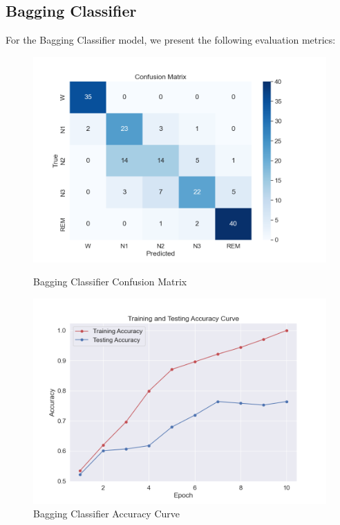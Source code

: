 \subsection{Bagging Classifier}

For the Bagging Classifier model, we present the following evaluation metrics:

\begin{figure}[H]
	\centering
	\begin{minipage}[t]{0.48\textwidth}
		\centering
		\includegraphics[width=\textwidth]{img/paper_1/BG_confusion_matrix.png}
		\caption{Bagging Classifier Confusion Matrix}
	\end{minipage}
	\hfill
	\begin{minipage}[t]{0.48\textwidth}
		\centering
		\includegraphics[width=\textwidth]{img/paper_1/accuracy_curve.png}
		\caption{Bagging Classifier Accuracy Curve}
	\end{minipage}
	

\end{figure}
